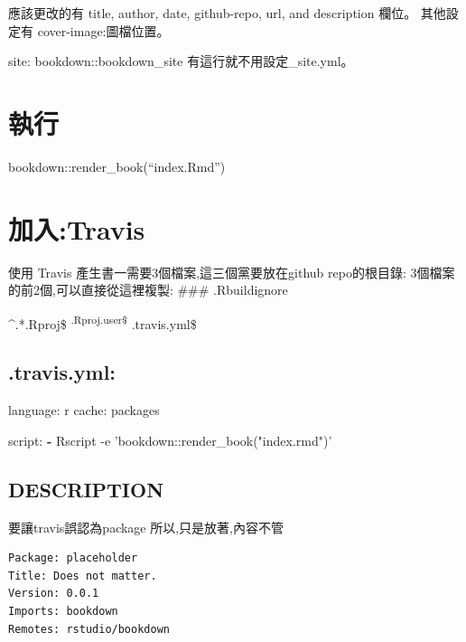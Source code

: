 \documentclass[]{book}
\newenvironment{Shaded}{\begin{snugshade}}{\end{snugshade}}
\newcommand{\AttributeTok}[1]{\textcolor[rgb]{0.77,0.63,0.00}{#1}}
\newcommand{\FunctionTok}[1]{\textcolor[rgb]{0.00,0.00,0.00}{#1}}
\newcommand{\KeywordTok}[1]{\textcolor[rgb]{0.13,0.29,0.53}{\textbf{#1}}}
\theoremstyle{definition}
\theoremstyle{definition}
\theoremstyle{definition}
\theoremstyle{remark}
\begin{document}
應該更改的有 title, author, date, github-repo, url, and description
欄位。 其他設定有 cover-image:圖檔位置。

site: bookdown::bookdown\_site 有這行就不用設定\_site.yml。

\section{執行}

bookdown::render\_book(``index.Rmd'')

\hypertarget{travis}{%
\section{加入:Travis}\label{travis}}

使用 Travis 產生書一需要3個檔案,這三個黨要放在github repo的根目錄:
3個檔案的前2個,可以直接從這裡複製: \#\#\# .Rbuildignore

\^{}.*.Rproj\$ \textsuperscript{.Rproj.user\$ }.travis.yml\$

\hypertarget{travis.yml-1}{%
\subsection{.travis.yml:}\label{travis.yml-1}}

\begin{Shaded}
\begin{Highlighting}[]
\FunctionTok{language:}\AttributeTok{ r}
\FunctionTok{cache:}\AttributeTok{ packages}

\FunctionTok{script:}
  \KeywordTok{-} \FunctionTok{Rscript -e 'bookdown:}\AttributeTok{:render_book("index.rmd")'}
\end{Highlighting}
\end{Shaded}

\hypertarget{description}{%
\subsection{DESCRIPTION}\label{description}}

要讓travis誤認為package 所以,只是放著,內容不管

\begin{verbatim}
Package: placeholder
Title: Does not matter.
Version: 0.0.1
Imports: bookdown
Remotes: rstudio/bookdown
\end{verbatim}
\end{document}
